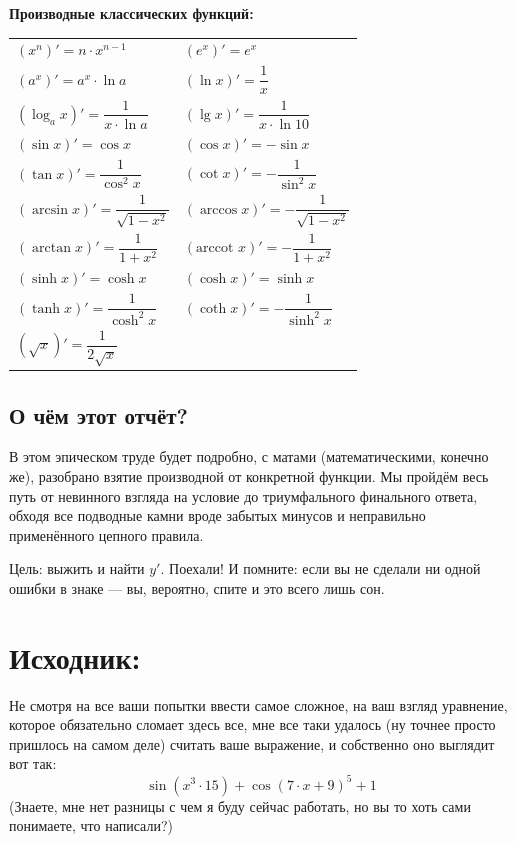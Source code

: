 \documentclass[a4paper,12pt]{article}
\begin{document}
\vspace{5mm}

\textbf{Производные классических функций:}

\begin{tabular}{p{}p{}}
    $(x^n)' = n \cdot x^{n-1}$ & $(e^x)' = e^x$ \\
    $(a^x)' = a^x \cdot \ln a$ & $(\ln x)' = \dfrac{1}{x}$ \\
    $(\log_a x)' = \dfrac{1}{x \cdot \ln a}$ & $(\lg x)' = \dfrac{1}{x \cdot \ln 10}$ \\
    $(\sin x)' = \cos x$ & $(\cos x)' = -\sin x$ \\
    $(\tan x)' = \dfrac{1}{\cos^2 x}$ & $(\cot x)' = -\dfrac{1}{\sin^2 x}$ \\
    $(\arcsin x)' = \dfrac{1}{\sqrt{1 - x^2}}$ & $(\arccos x)' = -\dfrac{1}{\sqrt{1 - x^2}}$ \\
    $(\arctan x)' = \dfrac{1}{1 + x^2}$ & $(\text{arccot } x)' = -\dfrac{1}{1 + x^2}$ \\
    $(\sinh x)' = \cosh x$ & $(\cosh x)' = \sinh x$ \\
    $(\tanh x)' = \dfrac{1}{\cosh^2 x}$ & $(\coth x)' = -\dfrac{1}{\sinh^2 x}$ \\
    $(\sqrt{x})' = \dfrac{1}{2\sqrt{x}}$ & \\
\end{tabular}

\subsection*{О чём этот отчёт?}

В этом эпическом труде будет подробно, с матами (математическими, конечно же), разобрано взятие производной от конкретной функции. Мы пройдём весь путь от невинного взгляда на условие до триумфального финального ответа, обходя все подводные камни вроде забытых минусов и неправильно применённого цепного правила.

Цель: выжить и найти $y'$. Поехали! И помните: если вы не сделали ни одной ошибки в знаке — вы, вероятно, спите и это всего лишь сон.
\section*{Исходник:}

Не смотря на все ваши попытки ввести самое сложное, на ваш взгляд уравнение, которое обязательно сломает здесь все, 
мне все таки удалось (ну точнее просто пришлось на самом деле) считать ваше выражение, и собственно оно выглядит вот так:
\begin{dmath}\operatorname{sin}\left(x^{3}\cdot 15\right) + \operatorname{cos}\left(7\cdot x+ 9\right) ^{5}+ 1\end{dmath}
(Знаете, мне нет разницы с чем я буду сейчас работать, но вы то хоть сами понимаете, что написали?)
\end{document}
